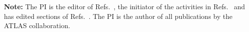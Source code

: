 \documentclass[11pt,a4paper]{article}
\begin{document}

\clearpage




{\bf Note:} The PI is the editor of Refs.~\cite{Boveia:2018yeb,Abercrombie:2015wmb,Aaboud:2018fzt,Aaboud:2019zxd,Doglioni:2019fza}, the initiator of the activities in Refs.~\cite{DMWGWebsite,iDMEu} and has edited sections of Refs.~\cite{Strategy:2019vxc,Alves:2017she,Aaboud:2016leb}. The PI is the author of all publications by the ATLAS collaboration.
\end{document}
